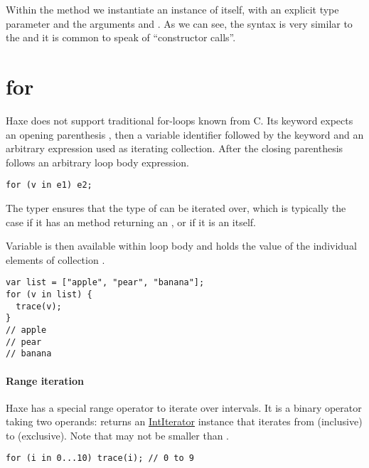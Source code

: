 
Within the  method we instantiate an instance of  itself, with an explicit type parameter  and the arguments  and . As we can see, the syntax is very similar to the  and it is common to speak of ``constructor calls''.



\section{for}
\label{expression-for}

Haxe does not support traditional for-loops known from C. Its  keyword expects an opening parenthesis \expr{(}, then a variable identifier followed by the keyword  and an arbitrary expression used as iterating collection. After the closing parenthesis \expr{)} follows an arbitrary loop body expression.

\begin{lstlisting}
for (v in e1) e2;
\end{lstlisting}

The typer ensures that the type of  can be iterated over, which is typically the case if it has an   method returning an , or if it is an  itself.

Variable  is then available within loop body  and holds the value of the individual elements of collection .

\begin{lstlisting}
var list = ["apple", "pear", "banana"];
for (v in list) {
  trace(v);
}
// apple
// pear
// banana
\end{lstlisting}

\paragraph{Range iteration}

Haxe has a special range operator to iterate over intervals. It is a binary operator taking two  operands:  returns an \href{http://api.haxe.org/IntIterator.html}{IntIterator} instance that iterates from  (inclusive) to  (exclusive). Note that  may not be smaller than .

\begin{lstlisting}
for (i in 0...10) trace(i); // 0 to 9
\end{lstlisting}

